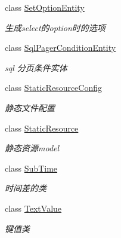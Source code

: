 \begin{DoxyCompactItemize}
class \hyperlink{class_x_c_l_net_tools_1_1_entity_1_1_set_option_entity}{Set\-Option\-Entity}
\begin{DoxyCompactList}\small\item\em 生成select的option时的选项 \end{DoxyCompactList}\item 
class \hyperlink{class_x_c_l_net_tools_1_1_entity_1_1_sql_pager_condition_entity}{Sql\-Pager\-Condition\-Entity}
\begin{DoxyCompactList}\small\item\em sql 分页条件实体 \end{DoxyCompactList}\item 
class \hyperlink{class_x_c_l_net_tools_1_1_entity_1_1_static_resource_config}{Static\-Resource\-Config}
\begin{DoxyCompactList}\small\item\em 静态文件配置 \end{DoxyCompactList}\item 
class \hyperlink{class_x_c_l_net_tools_1_1_entity_1_1_static_resource}{Static\-Resource}
\begin{DoxyCompactList}\small\item\em 静态资源model \end{DoxyCompactList}\item 
class \hyperlink{class_x_c_l_net_tools_1_1_entity_1_1_sub_time}{Sub\-Time}
\begin{DoxyCompactList}\small\item\em 时间差的类 \end{DoxyCompactList}\item 
class \hyperlink{class_x_c_l_net_tools_1_1_entity_1_1_text_value}{Text\-Value}
\begin{DoxyCompactList}\small\item\em 键值类 \end{DoxyCompactList}\end{DoxyCompactItemize}
